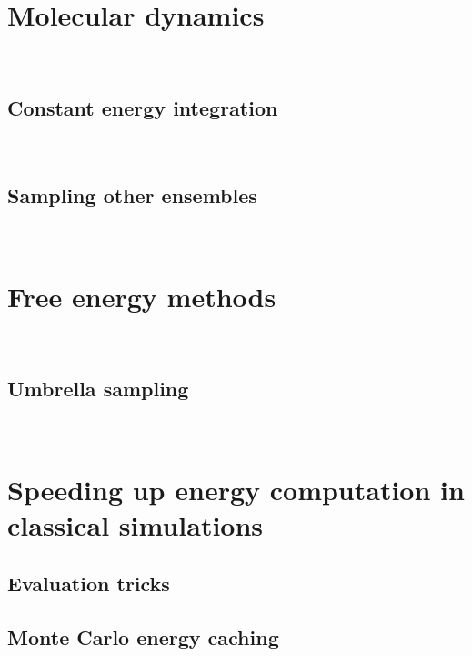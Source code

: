 \documentclass[thesis]{subfiles}
\begin{document}
\section{Molecular dynamics}
~



\subsection{Constant energy integration }
~

\subsection{Sampling other ensembles}
~

\section{Free energy methods}
~

\subsection{Umbrella sampling}
~


\section{Speeding up energy computation in classical simulations}

\subsection{Evaluation tricks}



\subsection{Monte Carlo energy caching}


\OnlyInSubfile{\printbibliography}
\end{document}
